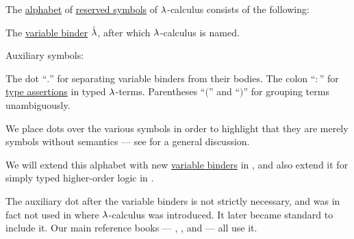 \begin{definition}\label{def:lambda_term_alphabet}\mimprovised
  The \hyperref[def:formal_language/alphabet]{alphabet} of \hyperref[con:reserved_symbol]{reserved symbols} of \( {\mathrm \lambda} \)-calculus consists of the following:

  \begin{thmenum}
     The \hyperref[con:variable_binder]{variable binder} \( \dot{{\mathrm \lambda}} \), after which \( {\mathrm \lambda} \)-calculus is named.

     Auxiliary symbols:
    \begin{thmenum}
       The dot \enquote{\( . \)} for separating variable binders from their bodies.
       The colon \enquote{\( : \)} for \hyperref[def:type_assertion]{type assertions} in typed \( {\mathrm \lambda} \)-terms.
       Parentheses \enquote{\( ( \)} and \enquote{\( ) \)} for grouping terms unambiguously.
    \end{thmenum}
  \end{thmenum}
\end{definition}
\begin{comments}
  \item We place dots over the various symbols in order to highlight that they are merely symbols without semantics --- see  for a general discussion.

  \item We will extend this alphabet with new \hyperref[con:variable_binder]{variable binders} in , and also extend it for simply typed higher-order logic in .

  \item The auxiliary dot after the variable binders is not strictly necessary, and was in fact not used in  where \( {\mathrm \lambda} \)-calculus was introduced. It later became standard to include it. Our main reference books --- , ,  and  --- all use it.
\end{comments}


